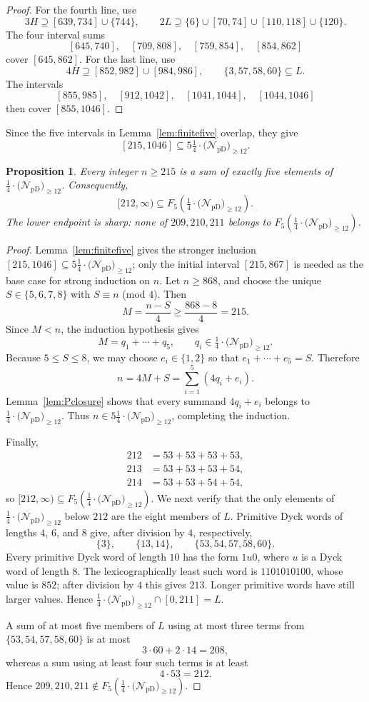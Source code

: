 \documentclass[12pt]{article}
\theoremstyle{plain}
\newtheorem{proposition}[theorem]{Proposition}
\newcommand{\Pset}{\tfrac14\cdot
  \bigl(\mathcal N_{\mathrm{pD}}\bigr)_{\ge 12}}
\begin{document}
\begin{proof}
For the fourth line, use
\[
 3H\supseteq[639,734]\cup\{744\},\qquad
 2L\supseteq\{6\}\cup[70,74]\cup[110,118]\cup\{120\}.
\]
The four interval sums
\[
 [645,740],\quad[709,808],\quad[759,854],\quad[854,862]
\]
cover $[645,862]$.  For the last line, use
\[
 4H\supseteq[852,982]\cup[984,986],
 \qquad \{3,57,58,60\}\subseteq L.
\]
The intervals
\[
 [855,985],\quad[912,1042],\quad[1041,1044],\quad[1044,1046]
\]
then cover $[855,1046]$.
\end{proof}

Since the five intervals in Lemma~\ref{lem:finitefive} overlap, they give
\[
 [215,1046]\subseteq5\Pset.
\]

\begin{proposition}\label{prop:fiveP}
Every integer $n\geq215$ is a sum of exactly five elements of $\Pset$.
Consequently,
\[
 [212,\infty)\subseteq F_5(\Pset).
\]
The lower endpoint is sharp: none of $209,210,211$ belongs to
$F_5(\Pset)$.
\end{proposition}

\begin{proof}
Lemma~\ref{lem:finitefive} gives the stronger inclusion
$[215,1046]\subseteq5\Pset$; only the initial interval $[215,867]$ is
needed as the base case for strong induction on $n$.  Let $n\geq868$, and
choose the unique
$S\in\{5,6,7,8\}$ with $S\equiv n$ (mod $4$).  Then
\[
 M=\frac{n-S}{4}\geq\frac{868-8}{4}=215.
\]
Since $M<n$, the induction hypothesis gives
\[
 M=q_1+\cdots+q_5,\qquad q_i\in\Pset.
\]
Because $5\leq S\leq8$, we may choose $e_i\in\{1,2\}$ so that
$e_1+\cdots+e_5=S$.  Therefore
\[
 n=4M+S=\sum_{i=1}^{5}(4q_i+e_i).
\]
Lemma~\ref{lem:Pclosure} shows that every summand $4q_i+e_i$ belongs to
$\Pset$.  Thus $n\in5\Pset$, completing the induction.

Finally,
\[
\begin{aligned}
212&=53+53+53+53,\\
213&=53+53+53+54,\\
214&=53+53+54+54,
\end{aligned}
\]
so $[212,\infty)\subseteq F_5(\Pset)$.  We next verify that the only elements of $\Pset$ below $212$ are the
eight members of $L$.  Primitive Dyck words of lengths $4$, $6$, and $8$
give, after division by $4$, respectively,
\[
 \{3\},\qquad \{13,14\},\qquad \{53,54,57,58,60\}.
\]
Every primitive Dyck word of length $10$ has the form $1u0$, where $u$
is a Dyck word of length $8$.  The lexicographically least such word is
$1101010100$, whose value is $852$; after division by $4$ this gives
$213$.  Longer primitive words have still larger values.  Hence
$\Pset\cap[0,211]=L$.

A sum of at most five members of $L$ using at most three terms from
$\{53,54,57,58,60\}$ is at most
\[
 3\cdot60+2\cdot14=208,
\]
whereas a sum using at least four such terms is at least
\[
 4\cdot53=212.
\]
Hence $209,210,211\notin F_5(\Pset)$.
\end{proof}
\end{document}
